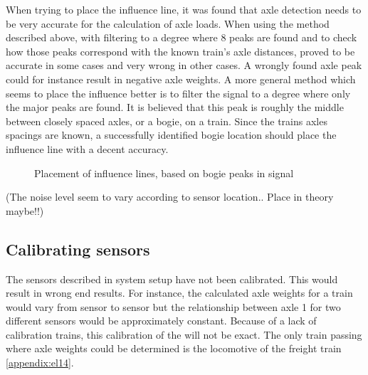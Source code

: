 When trying to place the influence line, it was found that axle detection needs to be very accurate for the calculation of axle loads. When using the method described above, with filtering to a degree where 8 peaks are found and to check how those peaks correspond with the known train's axle distances, proved to be accurate in some cases and very wrong in other cases. A wrongly found axle peak could for instance result in negative axle weights. A more general method which seems to place the influence better is to filter the signal to a degree where only the major peaks are found. It is believed that this peak is roughly the middle between closely spaced axles, or a bogie, on a train. Since the trains axles spacings are known, a successfully identified bogie location should place the influence line with a decent accuracy.
\begin{figure}[htbp]
	\centering
	
	\caption{Placement of influence lines, based on bogie peaks in signal}
	\label{fig:placing_influencelines}
\end{figure}


(The noise level seem to vary according to sensor location.. Place in theory maybe!!)

\subsection{Calibrating sensors}
The sensors described in system setup have not been calibrated. This would result in wrong end results. For instance, the calculated axle weights for a train would vary from sensor to sensor but the relationship between axle 1 for two different sensors would be approximately constant.
Because of a lack of calibration trains, this calibration of the will not be exact. The only train passing where axle weights could be determined is the locomotive of the freight train \ref{appendix:el14}.

